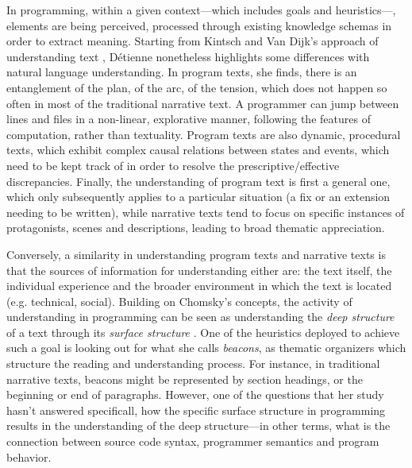 In programming, within a given context—which includes goals and heuristics—, elements are being perceived, processed through existing knowledge schemas in order to extract meaning. Starting from Kintsch and Van Dijk's approach of understanding text \citep{kintsch_model_1978}, Détienne nonetheless highlights some differences with natural language understanding. In program texts, she finds, there is an entanglement of the plan, of the arc, of the tension, which does not happen so often in most of the traditional narrative text. A programmer can jump between lines and files in a non-linear, explorative manner, following the features of computation, rather than textuality. Program texts are also dynamic, procedural texts, which exhibit complex causal relations between states and events, which need to be kept track of in order to resolve the prescriptive/effective discrepancies. Finally, the understanding of program text is first a general one, which only subsequently applies to a particular situation (a fix or an extension needing to be written), while narrative texts tend to focus on specific instances of protagonists, scenes and descriptions, leading to broad thematic appreciation.

Conversely, a similarity in understanding program texts and narrative texts is that the sources of information for understanding either are: the text itself, the individual experience and the broader environment in which the text is located (e.g. technical, social). Building on Chomsky's concepts, the activity of understanding in programming can be seen as understanding the \emph{deep structure} of a text through its \emph{surface structure} \citep{chomsky_aspects_1965}. One of the heuristics deployed to achieve such a goal is looking out for what she calls \emph{beacons}, as thematic organizers which structure the reading and understanding process. For instance, in traditional narrative texts, beacons might be represented by section headings, or the beginning or end of paragraphs. However, one of the questions that her study hasn't answered specificall, how the specific surface structure in programming results in the understanding of the deep structure—in other terms, what is the connection between source code syntax, programmer semantics and program behavior.

